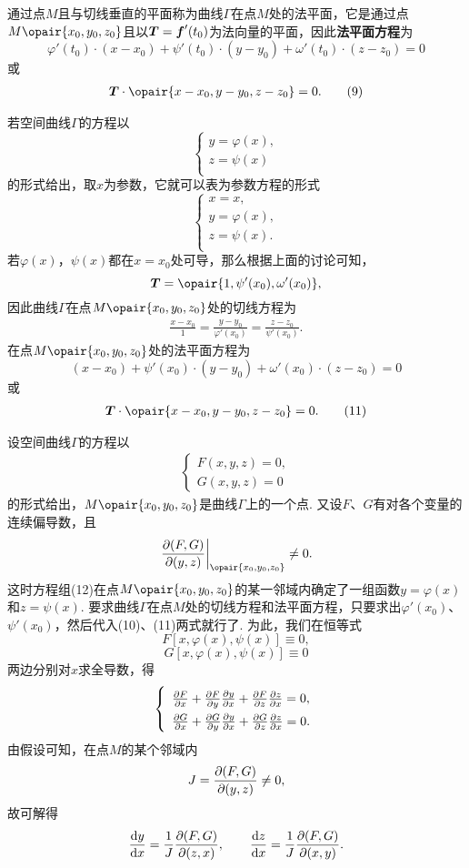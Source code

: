通过点\(M\)且与切线垂直的平面称为曲线\(\Gamma\)在点\(M\)处的法平面，它是通过点\(M\opair{x_0,y_0,z_0}\)且以\(\boldsymbol{T}=\boldsymbol{f}'(t_0)\)为法向量的平面，因此\textbf{法平面方程}为\[
\varphi'(t_0) \cdot (x-x_0) + \psi'(t_0) \cdot (y-y_0) + \omega'(t_0) \cdot (z-z_0) = 0
\]或\begin{gather}
\mat{T}\cdot\opair{x-x_0,y-y_0,z-z_0}=0.
\tag9
\end{gather}

若空间曲线\(\Gamma\)的方程以\[
\left\{ \begin{array}{l}
y = \varphi(x), \\
z = \psi(x) \\
\end{array} \right.
\]的形式给出，取\(x\)为参数，它就可以表为参数方程的形式\[
\left\{ \begin{array}{l}
x = x, \\
y = \varphi(x), \\
z = \psi(x). \\
\end{array} \right.
\]若\(\varphi(x)\)，\(\psi(x)\)都在\(x=x_0\)处可导，那么根据上面的讨论可知，\[
\mat{T} = \opair{1,\psi'(x_0),\omega'(x_0)},
\]因此曲线\(\Gamma\)在点\(M\opair{x_0,y_0,z_0}\)处的切线方程为\begin{gather}
\frac{x-x_0}{1}
=\frac{y-y_0}{\varphi'(x_0)}
=\frac{z-z_0}{\psi'(x_0)}.
\tag{10}
\end{gather}在点\(M\opair{x_0,y_0,z_0}\)处的法平面方程为\[
(x-x_0) + \psi'(x_0) \cdot (y-y_0) + \omega'(x_0) \cdot (z-z_0) = 0
\]或\begin{gather}
\mat{T}\cdot\opair{x-x_0,y-y_0,z-z_0}=0.
\tag{11}
\end{gather}

设空间曲线\(\Gamma\)的方程以\begin{gather}
\left\{ \begin{array}{l}
F(x,y,z)=0, \\
G(x,y,z)=0
\end{array} \right.
\tag{12}
\end{gather}的形式给出，\(M\opair{x_0,y_0,z_0}\)是曲线\(\Gamma\)上的一个点.
又设\(F\)、\(G\)有对各个变量的连续偏导数，且\[
\eval{\jacobi{F,G}{y,z}}_{\opair{x_0,y_0,z_0}} \neq 0.
\]这时方程组(12)在点\(M\opair{x_0,y_0,z_0}\)的某一邻域内确定了一组函数\(y=\varphi(x)\)和\(z=\psi(x)\).
要求曲线\(\Gamma\)在点\(M\)处的切线方程和法平面方程，只要求出\(\varphi'(x_0)\)、\(\psi'(x_0)\)，然后代入(10)、(11)两式就行了.
为此，我们在恒等式\[
F[x,\varphi(x),\psi(x)] \equiv 0,
\]\[
G[x,\varphi(x),\psi(x)] \equiv 0
\]两边分别对\(x\)求全导数，得\[
\def\arraystretch{1.5}
\left\{ \begin{array}{l}
\pdv{F}{x} + \pdv{F}{y} \pdv{y}{x} + \pdv{F}{z} \pdv{z}{x} = 0, \\
\pdv{G}{x} + \pdv{G}{y} \pdv{y}{x} + \pdv{G}{z} \pdv{z}{x} = 0.
\end{array} \right.
\]由假设可知，在点\(M\)的某个邻域内\[
J = \pdv{ (F,G) }{ (y,z) } \neq 0,
\]故可解得\[
\dv{y}{x} = \frac{1}{J} \pdv{ (F,G) }{ (z,x) },
\qquad
\dv{z}{x} = \frac{1}{J} \pdv{ (F,G) }{ (x,y) }.
\]

